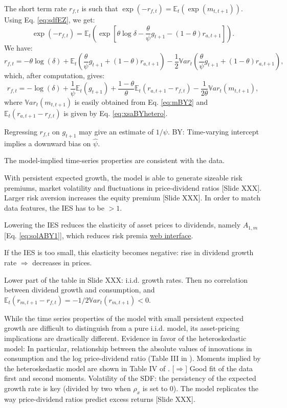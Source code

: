\documentclass[
  12pt,
]{book}
\theoremstyle{definition}
\theoremstyle{definition}
\theoremstyle{definition}
\theoremstyle{definition}
\theoremstyle{remark}
\begin{document}
The short term rate \(r_{f,t}\) is such that \(\exp(-r_{f,t})=\mathbb{E}_t(\exp(m_{t,t+1}))\).
Using Eq. \eqref{eq:sdfEZ}, we get:
\[
\exp(-r_{f,t})=\mathbb{E}_t\left(\exp\left[\theta \log \delta - \frac{\theta}{\psi} g_{t+1} - (1-\theta) r_{a,t+1}\right]\right).
\]
We have:
\begin{equation}
r_{f,t} = - \theta \log (\delta) + \mathbb{E}_t\left(\frac{\theta}{\psi} g_{t+1}+ (1-\theta)r_{a,t+1} \right) - \frac{1}{2}\mathbb{V}ar_t\left(\frac{\theta}{\psi} g_{t+1} + (1-\theta) r_{a,t+1}\right),
\end{equation}
which, after computation, gives:
\begin{equation}
r_{f,t} = - \log (\delta) + \frac{1}{\psi}\mathbb{E}_t(g_{t+1})+ \frac{1-\theta}{\theta} \mathbb{E}_t(r_{a,t+1}-r_{f,t}) - \frac{1}{2\theta}\mathbb{V}ar_t\left(m_{t,t+1}\right),\label{eq:rfBY}
\end{equation}
where \(\mathbb{V}ar_t\left(m_{t,t+1}\right)\) is easily obtained from Eq. \eqref{eq:mBY2} and \(\mathbb{E}_t(r_{a,t+1}-r_{f,t})\) is given by Eq. \eqref{eq:xsaBYhetero}.

Regressing \(r_{f,t}\) on \(g_{t+1}\) may give an estimate of \(1/\psi\). BY: Time-varying intercept implies a downward bias on \(\hat\psi\).

The model-implied time-series properties are consistent with the data.

With persistent expected growth, the model is able to generate sizeable risk premiums, market volatility and fluctuations in price-dividend ratios {[}Slide XXX{]}.
Larger risk aversion increases the equity premium {[}Slide XXX{]}.
In order to match data features, the IES has to be \(>1\).

Lowering the IES reduces the elasticity of asset prices to dividends, namely \(A_{1,m}\) {[}Eq. \eqref{eq:solABY1}{]}, which reduces risk premia \href{https://jrenne.shinyapps.io/LRRModels}{web interface}.

If the IES is too small, this elasticity becomes negative: rise in dividend growth rate \(\Rightarrow\) decreases in prices.

Lower part of the table in Slide XXX: i.i.d. growth rates. Then no correlation between dividend growth and consumption, and \(\mathbb{E}_t(r_{m,t+1}-r_{f,t})=-1/2 \mathbb{V}ar_t(r_{m,t+1}) < 0\).

While the time series properties of the model with small persistent expected growth are difficult to distinguish from a pure i.i.d. model, its asset-pricing implications are drastically different.
Evidence in favor of the heteroskedastic model: In particular, relationship between the absolute values of innovations in consumption and the log price-dividend ratio (Table III in \citet{Bansal_Yaron_2004}).
Moments implied by the heteroskedastic model are shown in Table IV of \citet{Bansal_Yaron_2004}.
{[}\(\Rightarrow\){]} Good fit of the data first and second moments.
Volatility of the SDF: the persistency of the expected growth rate is key (divided by two when \(\rho_x\) is set to 0).
The model replicates the way price-dividend ratios predict excess returns {[}Slide XXX{]}.
\end{document}
